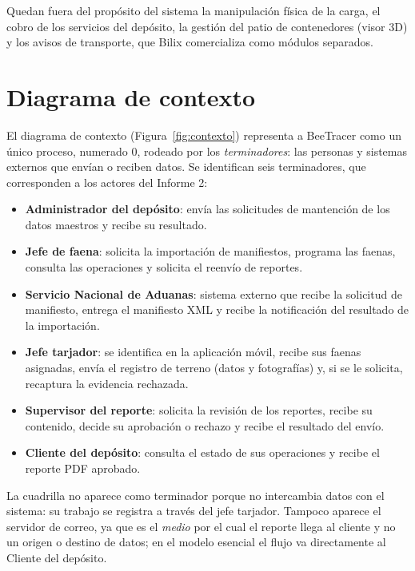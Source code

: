 Quedan fuera del propósito del sistema la manipulación física de la carga, el cobro de los
servicios del depósito, la gestión del patio de contenedores (visor 3D) y los avisos de
transporte, que Bilix comercializa como módulos separados.

\section{Diagrama de contexto}
\label{sec:contexto}

El diagrama de contexto (Figura~\ref{fig:contexto}) representa a BeeTracer como un único
proceso, numerado 0, rodeado por los \emph{terminadores}: las personas y sistemas externos que
envían o reciben datos. Se identifican seis terminadores, que corresponden a los actores del
Informe 2:

\begin{itemize}
    \item \textbf{Administrador del depósito}: envía las solicitudes de mantención de los datos
    maestros y recibe su resultado.
    \item \textbf{Jefe de faena}: solicita la importación de manifiestos, programa las faenas,
    consulta las operaciones y solicita el reenvío de reportes.
    \item \textbf{Servicio Nacional de Aduanas}: sistema externo que recibe la solicitud de
    manifiesto, entrega el manifiesto XML y recibe la notificación del resultado de la
    importación.
    \item \textbf{Jefe tarjador}: se identifica en la aplicación móvil, recibe sus faenas
    asignadas, envía el registro de terreno (datos y fotografías) y, si se le solicita,
    recaptura la evidencia rechazada.
    \item \textbf{Supervisor del reporte}: solicita la revisión de los reportes, recibe su
    contenido, decide su aprobación o rechazo y recibe el resultado del envío.
    \item \textbf{Cliente del depósito}: consulta el estado de sus operaciones y recibe el
    reporte PDF aprobado.
\end{itemize}

La cuadrilla no aparece como terminador porque no intercambia datos con el sistema: su
trabajo se registra a través del jefe tarjador. Tampoco aparece el servidor de correo, ya que
es el \emph{medio} por el cual el reporte llega al cliente y no un origen o destino de datos;
en el modelo esencial el flujo  va directamente al Cliente del depósito.


